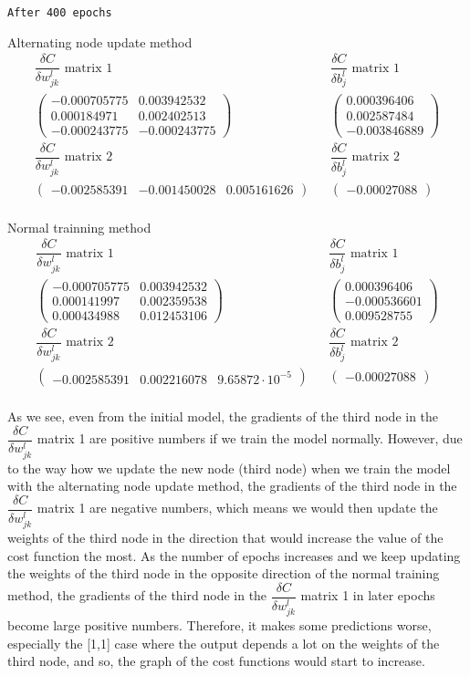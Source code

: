 \documentclass[12pt,english,]{article}
\newcommand{\mtx}[1]{\begin{pmatrix}#1\end{pmatrix}} %
\newcommand{\code}[1]{\colorbox{light-gray}{\texttt{#1}}}
\begin{document}
\code{After 400 epochs}

Alternating node update method
\begin{align*}
\text{$\dfrac{\delta C}{\delta w_{jk}^{l}}$ matrix 1} &&\text{$\dfrac{\delta C}{\delta b_{j}^{l}}$ matrix 1}\\
\mtx{-0.000705775 & 0.003942532\\  0.000184971 & 0.002402513 \\ -0.000243775 & -0.000243775} &&\mtx{0.000396406 \\ 0.002587484 \\ -0.003846889 }\\
\text{$\dfrac{\delta C}{\delta w_{jk}^{l}}$ matrix 2} &&\text{$\dfrac{\delta C}{\delta b_{j}^{l}}$ matrix 2}\\
\mtx{-0.002585391 & -0.001450028 &  0.005161626} &&\mtx{-0.00027088}\\
\end{align*}

Normal trainning method
\begin{align*}
\text{$\dfrac{\delta C}{\delta w_{jk}^{l}}$ matrix 1} &&\text{$\dfrac{\delta C}{\delta b_{j}^{l}}$ matrix 1}\\
\mtx{-0.000705775 & 0.003942532\\  0.000141997 & 0.002359538 \\ 0.000434988 & 0.012453106} &&\mtx{0.000396406 \\ -0.000536601 \\ 0.009528755 }\\
\text{$\dfrac{\delta C}{\delta w_{jk}^{l}}$ matrix 2} &&\text{$\dfrac{\delta C}{\delta b_{j}^{l}}$ matrix 2}\\
\mtx{-0.002585391 & 0.002216078 &  9.65872\cdot10^{-5}} &&\mtx{-0.00027088}\\
\end{align*}

As we see, even from the initial model, the gradients of the third node in the $\dfrac{\delta C}{\delta w_{jk}^{l}}$ matrix 1 are positive numbers if we train the model normally. However, due to the way how we update the new node (third node) when we train the model with the alternating node update method,  the gradients of the third node in the $\dfrac{\delta C}{\delta w_{jk}^{l}}$ matrix 1 are negative numbers, which means we would then update the weights of the third node in the direction that would increase the value of the cost function the most. As the number of epochs increases and we keep updating the weights of the third node in the opposite direction of the normal training method, the gradients of the third node in the $\dfrac{\delta C}{\delta w_{jk}^{l}}$ matrix 1 in later epochs become large positive numbers. Therefore, it makes some predictions worse, especially the [1,1] case where the output depends a lot on the weights of the third node, and so, the graph of the cost functions would start to increase.
\end{document}
